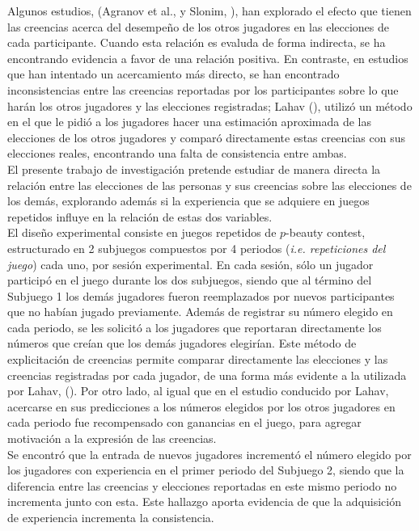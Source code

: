 Algunos estudios, (Agranov et al., \citeyear{Agranov} y Slonim, \citeyear{Slonim}),  han explorado el efecto que tienen las creencias acerca del desempeño de los otros jugadores en las elecciones de cada participante. Cuando esta relación es evaluda de forma indirecta, se ha encontrando evidencia a favor de una relación positiva. En contraste, en estudios que han intentado un acercamiento más directo, se han encontrado inconsistencias entre las creencias reportadas por los participantes sobre lo que harán los otros jugadores y las elecciones registradas; Lahav (\citeyear{Lahav}), utilizó un método en el que le pidió a los jugadores hacer una estimación aproximada de las elecciones de los otros jugadores y comparó directamente estas creencias con sus elecciones reales, encontrando una falta de consistencia entre ambas.\\

El presente trabajo de investigación pretende estudiar de manera directa la relación entre las elecciones de las personas y sus creencias sobre las elecciones de los demás, explorando además si la experiencia que se adquiere en juegos repetidos influye en la relación de estas dos variables.\\

El diseño experimental consiste en juegos repetidos de $p$-beauty contest, estructurado en 2 subjuegos compuestos por 4 periodos (\textit{i.e. repeticiones del juego}) cada uno, por sesión experimental. En cada sesión, sólo un jugador participó en el juego durante los dos subjuegos, siendo que al término del Subjuego 1 los demás jugadores fueron reemplazados por nuevos participantes que no habían jugado previamente. Además de registrar su número elegido en cada periodo, se les solicitó a los jugadores que reportaran directamente los números que creían que los demás jugadores elegirían. Este método de explicitación de creencias permite comparar directamente las elecciones y las creencias registradas por cada jugador, de una forma más evidente a la utilizada por Lahav, (\citeyear{Lahav}). Por otro lado, al igual que en el estudio conducido por Lahav, acercarse en sus predicciones a los números elegidos por los otros jugadores en cada periodo fue recompensado con ganancias en el juego, para agregar motivación a la expresión de las creencias.\\

Se encontró que la entrada de nuevos jugadores incrementó el número elegido por los jugadores con experiencia en el primer periodo del Subjuego 2, siendo que la diferencia entre las creencias y elecciones reportadas en este mismo periodo no incrementa junto con esta. Este hallazgo aporta evidencia de que la adquisición de experiencia incrementa la consistencia.\\

